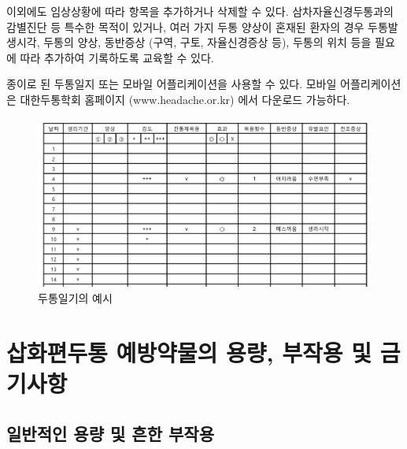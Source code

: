 \documentclass[]{book}
\begin{document}
이외에도 임상상황에 따라 항목을 추가하거나 삭제할 수 있다. 삼차자율신경두통과의 감별진단 등 특수한 목적이 있거나, 여러 가지 두통 양상이 혼재된 환자의 경우 두통발생시각, 두통의 양상, 동반증상 (구역, 구토, 자율신경증상 등), 두통의 위치 등을 필요에 따라 추가하여 기록하도록 교육할 수 있다.

종이로 된 두통일지 또는 모바일 어플리케이션을 사용할 수 있다. 모바일 어플리케이션은 대한두통학회 홈페이지 (www.headache.or.kr) 에서 다운로드 가능하다.

\begin{figure}
\centering
\includegraphics{static/DiaryExample.png}
\caption{두통일기의 예시}
\end{figure}

\hypertarget{section-21}{%
\chapter{삽화편두통 예방약물의 용량, 부작용 및 금기사항}\label{section-21}}

\hypertarget{section-22}{%
\section{일반적인 용량 및 흔한 부작용}\label{section-22}}
\end{document}
